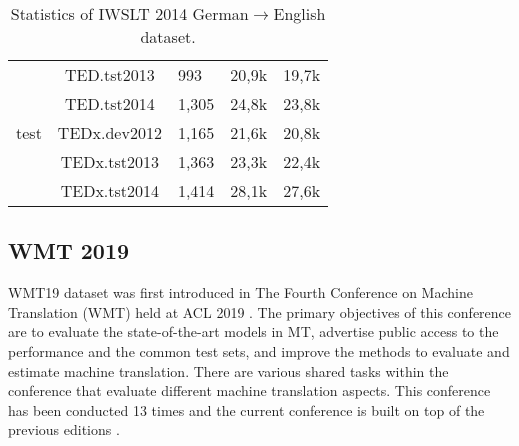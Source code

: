 \begin{table}[h]
\begin{tabular}{@{}cclll@{}}
        \multirow{5}{*}{test}                             & TED.tst2013                                             & 993                                 & 20,9k                           & 19,7k \\
                                                          & TED.tst2014                                             & 1,305                               & 24,8k                           & 23,8k \\
                                                          & TEDx.dev2012                                            & 1,165                               & 21,6k                           & 20,8k \\
                                                          & TEDx.tst2013                                            & 1,363                               & 23,3k                           & 22,4k \\
                                                          & TEDx.tst2014                                            & 1,414                               & 28,1k                           & 27,6k \\ \bottomrule
    \end{tabular}
    \caption{Statistics of IWSLT 2014 German$\rightarrow$English dataset.}
    \label{tab:iwslt14stat}
\end{table}

\subsection{WMT 2019}
WMT19 dataset was first introduced in The Fourth Conference on Machine Translation (WMT) held at ACL 2019 . The primary objectives of this conference are to evaluate the state-of-the-art models in MT, advertise public access to the performance and the common test sets, and improve the methods to evaluate and estimate machine translation. There are various shared tasks within the conference that evaluate different machine translation aspects. This conference has been conducted 13 times and the current conference is built on top of the previous editions .

